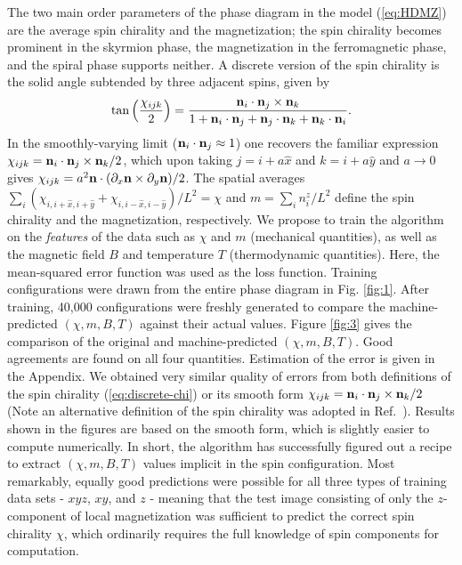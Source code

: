 \documentclass[reprint,amsmath,amssymb,aps,showpacs,superscriptaddress,prb]{revtex4-1}
\newcommand{\ba}{\begin{eqnarray}}
\newcommand{\ea}{\end{eqnarray}}
\renewcommand{\v}[1]{{\bf #1}}
\begin{document}
The two main order parameters of the phase diagram in the model (\ref{eq:HDMZ}) are the average spin chirality and the magnetization; the spin chirality becomes prominent in the skyrmion phase, the magnetization in the ferromagnetic phase, and the spiral phase supports neither. A discrete version of the spin chirality is the solid angle subtended by three adjacent spins, given by~\cite{berg81,zang16,han-book}
%
\ba \tan \left( {\chi_{ijk} \over 2} \right)  = {\v n_i \cdot \v n_j \times \v n_k \over 1 + \v n_i \cdot \v n_j + \v n_j \cdot \v n_k + \v n_k \cdot \v n_i }  . \label{eq:discrete-chi}\ea
%
In the smoothly-varying limit ($\v n_i \cdot \v n_j \approx 1$) one recovers the familiar expression $\chi_{ijk} = \v n_i \cdot \v n_j \times \v n_k /2$, which upon taking $j = i + a \hat{x}$ and $k = i + a\hat{y}$ and $a\rightarrow 0$ gives $\chi_{ijk} = a^2 \v n \cdot (\partial_x \v n \times \partial_y \v n)/2$. The spatial averages $\sum_{i} ( \chi_{i, i+\hat{x}, i+\hat{y}} + \chi_{i, i-\hat{x}, i-\hat{y}} ) /L^2 =\chi$ and $m =\sum_i n_i^z /L^2$  define the spin chirality and the magnetization, respectively. We propose to train the algorithm on the {\it features} of the data such as $\chi$ and $m$ (mechanical quantities), as well as the magnetic field $B$ and temperature $T$ (thermodynamic quantities). Here, the mean-squared error function was used as the loss function. Training configurations were drawn from the entire phase diagram in Fig. \ref{fig:1}. After training, 40,000 configurations were freshly generated to compare the machine-predicted $(\chi,m, B, T)$ against their actual values. Figure \ref{fig:3} gives the comparison of the original and machine-predicted $(\chi, m, B, T)$. Good agreements are found on all four quantities. Estimation of the error is given in the Appendix. We obtained very similar quality of errors from both definitions of the spin chirality (\ref{eq:discrete-chi}) or its smooth form $\chi_{ijk} = \v n_i \cdot \v n_j \times \v n_k /2$ (Note an alternative definition of the spin chirality was adopted in Ref.~). Results shown in the figures are based on the smooth form, which is slightly easier to compute numerically. In short, the algorithm has successfully figured out a recipe to extract $(\chi, m, B, T)$ values implicit in the spin configuration. Most remarkably, equally good predictions were possible for all three types of training data sets -  $xyz$, $xy$, and $z$ - meaning that the test image consisting of only the $z$-component of local magnetization was sufficient to predict the correct spin chirality $\chi$, which ordinarily requires the full knowledge of spin components for computation.
\end{document}
